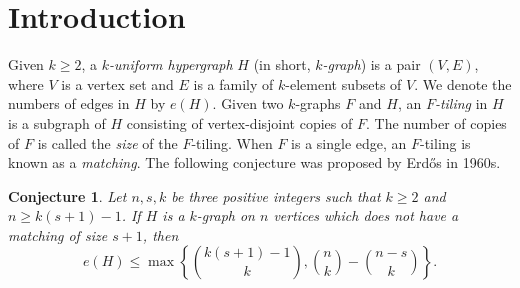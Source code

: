 \documentclass[11pt, reqno]{amsart}    	%
\newtheorem{conj}[thm]{Conjecture}
\theoremstyle{definition}
\numberwithin{equation}{section}
\begin{document}
	\section{Introduction}
	Given $ k\ge2 $, a \emph{$ k $-uniform hypergraph} $H$ (in short, \emph{$ k $-graph}) is a pair $(V,E) $, where $V$ is a vertex set and $E$ is a family of $k$-element subsets of $V$. We denote the numbers of edges in $H$ by $ e(H) $.
	Given two $k$-graphs $F$ and $H$, an \emph{$ F $-tiling} in $ H $ is a subgraph of $H$ consisting of vertex-disjoint copies of $F$. 
	The number of copies of $F$ is called the \emph{size} of the $F$-tiling.
	When $F$ is a single edge, an $F$-tiling is known as a \emph{matching}. 
	The following conjecture was proposed by Erd\H os in 1960s.
	
	\begin{conj} \cite{MR260599}
		\label{conj}
		Let $ n,s,k $ be three positive integers such that $ k\ge2 $ and $ n \ge k(s+1)-1 $. If $H$ is a $ k $-graph on $ n $ vertices which does not have a matching of size $s+1$, then
		\[ e(H)\le \max \left \{ \binom{k(s+1)-1}{k}, \binom{n}{k}-\binom{n-s}{k} \right \}. \]
		
		
		
	\end{conj} 
	
\end{document}
